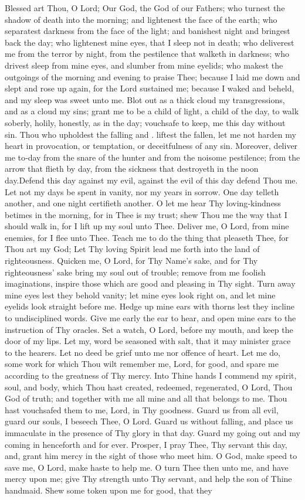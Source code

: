 Blessed art Thou, O Lord; Our God, the God of our Fathers; who turnest the shadow of death into the morning; and lightenest the face of the earth; who separatest darkness from the face  of the light; and banishest night and bringest back the day; who lightenest mine eyes, that I sleep not in death; who deliverest me from the terror by night, from the pestilence that walketh in darkness; who drivest sleep from mine eyes, and slumber from mine eyelids; who makest the outgoings of the morning and evening to praise Thee; because I laid me down and slept and rose up again, for the Lord sustained me; because I waked and beheld, and my sleep was sweet unto me. Blot out as a thick cloud my transgressions,  and as a cloud my sins; grant me to be a child of light, a child of the day, to walk soberly, holily, honestly, as in the day; vouchsafe to keep, me this day without sin. Thou who upholdest the falling and . liftest the fallen, let me not harden my heart in provocation, or temptation, or deceitfulness of any sin. Moreover, deliver me to‑day from the snare of the hunter and from the noisome pestilence; from the arrow that flieth by day, from the sickness that destroyeth in the noon day.Defend this day against my evil, against the evil of this day defend Thou me. Let not my days be spent in vanity, nor my years in sorrow. One day telleth another, and one night certifieth another. O let me hear Thy loving‑kindness betimes in the morning, for in Thee is my trust; shew Thou me the way that I should walk in, for I lift up my soul unto Thee. Deliver me, O Lord, from mine enemies, for I flee unto Thee. Teach me to do the thing that pleaseth Thee, for Thou art my God; Let Thy loving Spirit lead me forth into the land of righteousness. Quicken me, O Lord, for Thy Name’s sake, and for Thy righteousness’ sake bring my soul out of trouble; remove from me foolish imaginations, inspire those which are good and pleasing in Thy sight. Turn away mine eyes lest they behold vanity; let mine eyes look right on, and let mine eyelids look straight before me. Hedge up mine ears with thorns lest they incline to undisciplined words. Give me early the ear to hear, and open mine ears to the instruction of Thy oracles. Set a watch, O Lord, before my mouth, and keep the door of my lips. Let my, word be seasoned with salt, that it may minister grace to the hearers. Let no deed be grief unto me nor offence of heart. Let me do, some work for which Thou wilt remember me, Lord, for good, and spare me according to the greatness of Thy mercy. Into Thine hands I commend my spirit, soul, and body, which Thou hast created, redeemed, regenerated, O Lord, Thou God of truth; and together with me all mine and all that belongs to me. Thou hast vouchsafed them to me, Lord, in Thy goodness. Guard us from all evil, guard our souls, I beseech Thee, O Lord. Guard us without falling, and place us immaculate in the presence of Thy glory in that day. Guard my going out and my coming in henceforth and for ever. Prosper, I pray Thee, Thy servant this day, and, grant him mercy in the sight of those who meet him. O God, make speed to save me, O Lord, make haste to help me. O turn Thee then unto me, and have mercy upon me; give Thy strength unto Thy servant, and help the son of Thine handmaid. Shew some token upon me for good, that they 